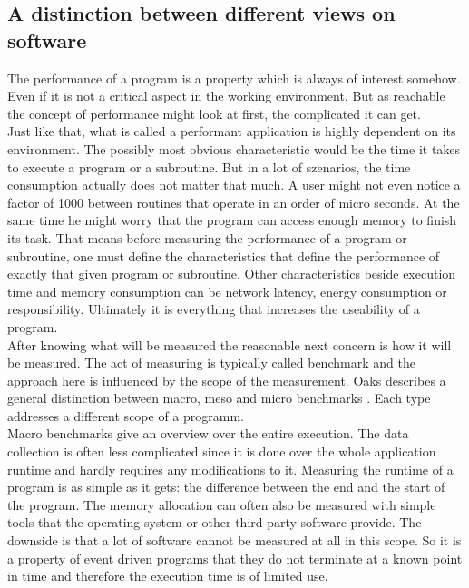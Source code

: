 \subsection{A distinction between different views on software}
The performance of a program is a property which is always of interest somehow. Even if it is not a critical aspect in the working environment. But as reachable the concept of performance might look at first, the complicated it can get.\\
Just like that, what is called a performant application is highly dependent on its environment. The possibly most obvious characteristic would be the time it takes to execute a program or a subroutine. But in a lot of szenarios, the time consumption actually does not matter that much. A user might not even notice a factor of 1000 between routines that operate in an order of micro seconds. At the same time he might worry that the program can access enough memory to finish its task. That means before measuring the performance of a program or subroutine, one must define the characteristics that define the performance of exactly that given program or subroutine. Other characteristics beside execution time and memory consumption can be network latency, energy consumption or responsibility. Ultimately it is everything that increases the useability of a program.\\
After knowing what will be measured the reasonable next concern is how it will be measured. The act of measuring is typically called benchmark and the approach here is influenced by the scope of the measurement. Oaks describes a general distinction between macro, meso and micro benchmarks \cite{oaks2014java}. Each type addresses a different scope of a programm.\\ %
Macro benchmarks give an overview over the entire execution. The data collection is often less complicated since it is done over the whole application runtime and hardly requires any modifications to it. Measuring the runtime of a program is as simple as it gets: the difference between the end and the start of the program. The memory allocation can often also be measured with simple tools that the operating system or other third party software provide. The downside is that a lot of software cannot be measured at all in this scope. So it is a property of event driven programs that they do not terminate at a known point in time and therefore the execution time is of limited use.\\
